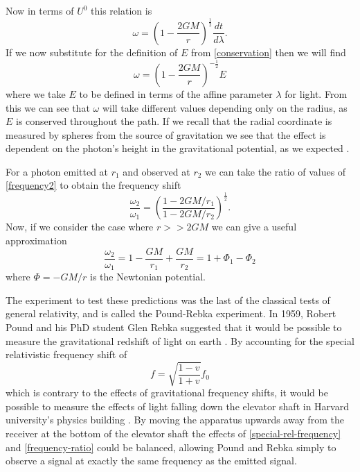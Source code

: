 Now in terms of \(U^0\) this relation is \cite{carroll}
\begin{equation} \label{frequency}
	\omega = \left(1 - \frac{2 G M}{r}\right)^{\frac{1}{2}} \frac{dt}{d \lambda} .
\end{equation}
If we now substitute for the definition of \(E\) from \eqref{conservation} then we will find
\begin{equation} \label{frequency2}
	\omega = \left( 1 - \frac{2 G M}{r} \right)^{-\frac{1}{2}} E
\end{equation}
where we take \(E\) to be defined in terms of the affine parameter \(\lambda\) for light. From this we can see that \(\omega\) will take different values depending only on the radius, as \(E\) is conserved throughout the path. If we recall that the radial coordinate is measured by spheres from the source of gravitation we see that the effect is dependent on the photon's height in the gravitational potential, as we expected \cite{carroll}. 

For a photon emitted at \(r_1\) and observed at \(r_2\) we can take the ratio of values of \eqref{frequency2} to obtain the frequency shift
\begin{equation} \label{frequency-ratio}
	\frac{\omega_2}{\omega_1} = \left( \frac{1 - 2GM/r_{1}}{1 - 2GM/r_{2}}\right)^{\frac{1}{2}} .
\end{equation}
Now, if we consider the case where \(r >> 2GM\) we can give a useful approximation
\begin{equation} \label{frequency-shift-approx}
	\frac{\omega_2}{\omega_1} = 1 - \frac{GM}{r_1} + \frac{GM}{r_2} = 1 + \Phi_1 - \Phi_2
\end{equation}
where \(\Phi = -GM / r\) is the Newtonian potential.

The experiment to test these predictions was the last of the classical tests of general relativity, and is called the Pound-Rebka experiment. In 1959, Robert Pound and his PhD student Glen Rebka suggested that it would be possible to measure the gravitational redshift of light on earth \cite{poundrebka}. By accounting for the special relativistic frequency shift of
\begin{equation} \label{special-rel-frequency}
	f = \sqrt{\frac{1 - v}{1 + v}} f_{0}
\end{equation}
which is contrary to the effects of gravitational frequency shifts, it would be possible to measure the effects of light falling down the elevator shaft in Harvard university's physics building \cite{poundrebka}. By moving the apparatus upwards away from the receiver at the bottom of the elevator shaft the effects of \eqref{special-rel-frequency} and \eqref{frequency-ratio} could be balanced, allowing Pound and Rebka simply to observe a signal at exactly the same frequency as the emitted signal.

